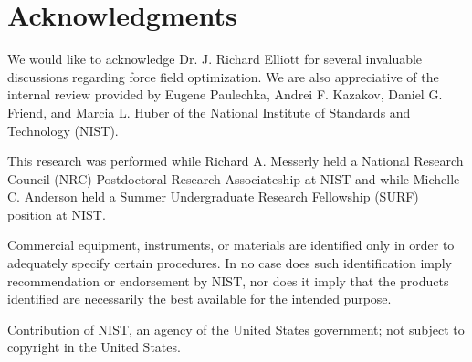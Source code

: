 \documentclass[journal=jced,manuscript=article]{achemso}
\begin{document}
\section{Acknowledgments}

We would like to acknowledge Dr. J. Richard Elliott for several invaluable discussions regarding force field optimization. We are also appreciative of the internal review provided by Eugene Paulechka, Andrei F. Kazakov, Daniel G. Friend, and Marcia L. Huber of the National Institute of Standards and Technology (NIST).

This research was performed while Richard A. Messerly held a National Research Council (NRC) Postdoctoral Research Associateship at NIST and while Michelle C. Anderson held a Summer Undergraduate Research Fellowship (SURF) position at NIST. 

Commercial equipment, instruments, or materials are identified only in order to adequately specify certain procedures. In no case does such identification imply recommendation or endorsement by NIST, nor does it imply that the products identified are necessarily the best available for the intended purpose.

Contribution of NIST, an agency of the United States government; not subject to copyright in the United States.



%
%
%
%
%
%
\end{document}
